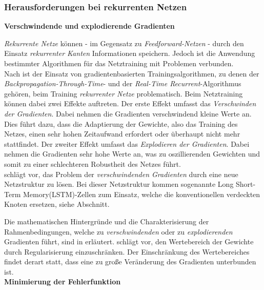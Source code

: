  
\subsubsection{Herausforderungen bei rekurrenten Netzen}
\label{cha_recurrent_problem}

\textbf{Verschwindende und explodierende Gradienten}

\textit{Rekurrente Netze} können - im Gegensatz zu \textit{Feedforward-Netzen} - durch den Einsatz \textit{rekurrenter Kanten} Informationen speichern. Jedoch ist die Anwendung bestimmter Algorithmen für das Netztraining mit Problemen verbunden. \\
Nach \cite{Hochreiter.2001} ist der Einsatz von gradientenbasierten Trainingsalgorithmen, zu denen der \textit{Backpropagation-Through-Time}- und der \textit{Real-Time Recurrent}-Algorithmus gehören, beim Training \textit{rekurrenter Netze} problematisch. Beim  Netztraining können dabei zwei Effekte auftreten. Der erste Effekt umfasst das \textit{Verschwinden der Gradienten}. Dabei nehmen die Gradienten verschwindend kleine Werte an. Dies führt dazu, dass die Adaptierung der Gewichte, also das Training des Netzes, einen sehr hohen Zeitaufwand erfordert oder überhaupt nicht mehr stattfindet. Der zweiter Effekt umfasst das \textit{Explodieren der Gradienten}. Dabei nehmen die Gradienten sehr hohe Werte an, was zu oszillierenden Gewichten und somit zu einer schlechteren Robustheit des Netzes führt. \cite{Hochreiter.2001} \\
\cite{Hochreiter.2001} schlägt vor, das Problem der \textit{verschwindenden Gradienten} durch eine neue Netzstruktur zu lösen. Bei dieser Netzstruktur kommen sogenannte Long Short-Term Memory(LSTM)-Zellen zum Einsatz, welche die konventionellen verdeckten Knoten ersetzen, siehe Abschnitt. 

Die mathematischen Hintergründe und die Charakterisierung der Rahmenbedingungen, welche zu \textit{verschwindenden} oder zu \textit{explodierenden} Gradienten führt, sind in \cite{Pascanu.11212012} erläutert. \cite{Pascanu.11212012} schlägt vor, den Wertebereich der Gewichte durch Regularisierung einzuschränken. Der Einschränkung des Wertebereiches findet derart statt, dass eine zu große Veränderung des Gradienten unterbunden ist. \\


\textbf{Minimierung der Fehlerfunktion}

